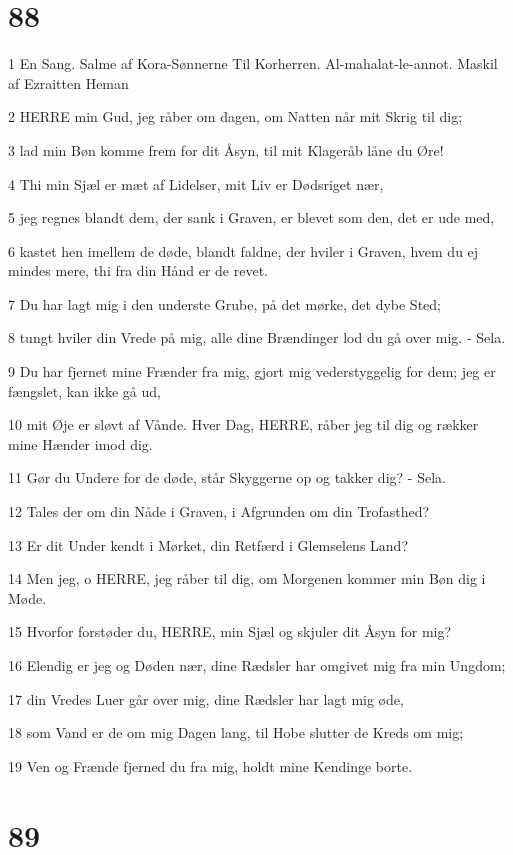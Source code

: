 \chapter{88}

\par 1 En Sang. Salme af Kora-Sønnerne Til Korherren. Al-mahalat-le-annot. Maskil af Ezraitten Heman
\par 2 HERRE min Gud, jeg råber om dagen, om Natten når mit Skrig til dig;
\par 3 lad min Bøn komme frem for dit Åsyn, til mit Klageråb låne du Øre!
\par 4 Thi min Sjæl er mæt af Lidelser, mit Liv er Dødsriget nær,
\par 5 jeg regnes blandt dem, der sank i Graven, er blevet som den, det er ude med,
\par 6 kastet hen imellem de døde, blandt faldne, der hviler i Graven, hvem du ej mindes mere, thi fra din Hånd er de revet.
\par 7 Du har lagt mig i den underste Grube, på det mørke, det dybe Sted;
\par 8 tungt hviler din Vrede på mig, alle dine Brændinger lod du gå over mig. - Sela.
\par 9 Du har fjernet mine Frænder fra mig, gjort mig vederstyggelig for dem; jeg er fængslet, kan ikke gå ud,
\par 10 mit Øje er sløvt af Vånde. Hver Dag, HERRE, råber jeg til dig og rækker mine Hænder imod dig.
\par 11 Gør du Undere for de døde, står Skyggerne op og takker dig? - Sela.
\par 12 Tales der om din Nåde i Graven, i Afgrunden om din Trofasthed?
\par 13 Er dit Under kendt i Mørket, din Retfærd i Glemselens Land?
\par 14 Men jeg, o HERRE, jeg råber til dig, om Morgenen kommer min Bøn dig i Møde.
\par 15 Hvorfor forstøder du, HERRE, min Sjæl og skjuler dit Åsyn for mig?
\par 16 Elendig er jeg og Døden nær, dine Rædsler har omgivet mig fra min Ungdom;
\par 17 din Vredes Luer går over mig, dine Rædsler har lagt mig øde,
\par 18 som Vand er de om mig Dagen lang, til Hobe slutter de Kreds om mig;
\par 19 Ven og Frænde fjerned du fra mig, holdt mine Kendinge borte.

\chapter{89}

